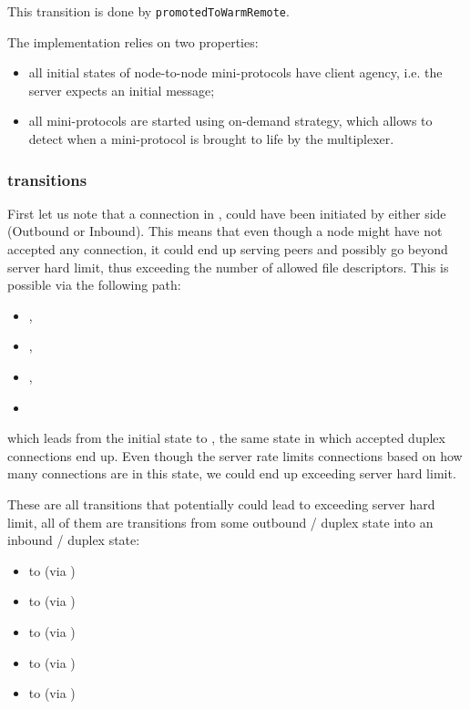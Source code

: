 \begin{detail}
  This transition is done by \texttt{promotedToWarmRemote}.

  The implementation relies on two properties:
  \begin{itemize}
    \item all initial states of node-to-node mini-protocols have client agency, i.e. the
      server expects an initial message;
    \item all mini-protocols are started using on-demand strategy, which allows
      to detect when a mini-protocol is brought to life by the multiplexer.
  \end{itemize}
\end{detail}


\subsubsection{\Prune{} transitions}
First let us note that a connection in \InboundStateDup{}, could have been
initiated by either side (Outbound or Inbound). This means that even though a node might have not
accepted any connection, it could end up serving peers and possibly go beyond
server hard limit, thus exceeding the number of allowed file descriptors. This is
possible via the following path:

\begin{itemize}
  \item[] \Connected{},
  \item[] \NegotiatedDupOut{},
  \item[] \PromotedToWarmDupRem{},
  \item[] \DemotedToColdDupLoc{}
\end{itemize}

which leads from the initial state \InitialState{} to \InboundStateDup{}, the
same state in which accepted duplex connections end up. Even though the server
rate limits connections based on how many connections are in this state, we
could end up exceeding server hard limit.

These are all transitions that potentially could lead to exceeding server hard limit,
all of them are transitions from some outbound / duplex state into an inbound / duplex state:
\begin{itemize}
  \item \DuplexState{} to \InboundStateDup{} (via \DemotedToColdDupLoc{})
  \item \OutboundStateDupTau{} to \InboundStateDup{} (via \DemotedToColdDupLoc{})
  \item \OutboundIdleStateDup{} to \InboundStateDup{} (via \AwakeDupRem{})
  \item \OutboundStateDupTau{} to \DuplexState{} (via \PromotedToWarmDupRem{})
  \item \OutboundStateDup{} to \DuplexState{} (via \PromotedToWarmDupRem{})
\end{itemize}


